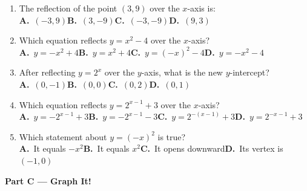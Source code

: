 \documentclass[12pt]{article}
\begin{document}
\begin{enumerate}[label=\textbf{CM\arabic*.},leftmargin=*,itemsep=14pt]

\item The reflection of the point $(3,9)$ over the $x$-axis is:\\[5pt]
\textbf{A.}\ $(-3,9)$\qquad \textbf{B.}\ $(3,-9)$\qquad \textbf{C.}\ $(-3,-9)$\qquad \textbf{D.}\ $(9,3)$

\item Which equation reflects $y=x^2-4$ over the $x$-axis?\\[5pt]
\textbf{A.}\ $y=-x^2+4$\qquad \textbf{B.}\ $y=x^2+4$\qquad \textbf{C.}\ $y=(-x)^2-4$\qquad \textbf{D.}\ $y=-x^2-4$

\item After reflecting $y=2^x$ over the $y$-axis, what is the new $y$-intercept?\\[5pt]
\textbf{A.}\ $(0,-1)$\qquad \textbf{B.}\ $(0,0)$\qquad \textbf{C.}\ $(0,2)$\qquad \textbf{D.}\ $(0,1)$

\item Which equation reflects $y=2^{x-1}+3$ over the $x$-axis?\\[5pt]
\textbf{A.}\ $y=-2^{x-1}+3$\qquad \textbf{B.}\ $y=-2^{x-1}-3$\qquad \textbf{C.}\ $y=2^{-(x-1)}+3$\qquad \textbf{D.}\ $y=2^{-x-1}+3$

\item Which statement about $y=(-x)^2$ is true?\\[5pt]
\textbf{A.}\ It equals $-x^2$\qquad \textbf{B.}\ It equals $x^2$\qquad \textbf{C.}\ It opens downward\qquad \textbf{D.}\ Its vertex is $(-1,0)$

\end{enumerate}

\vspace{0.8em}
\noindent\textbf{\large Part C --- Graph It!}
\vspace{0.4em}
\end{document}
